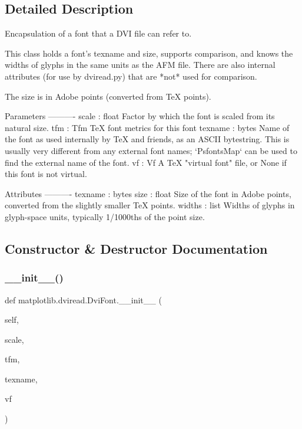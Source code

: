 \subsection{Detailed Description}
\begin{DoxyVerb}Encapsulation of a font that a DVI file can refer to.

This class holds a font's texname and size, supports comparison,
and knows the widths of glyphs in the same units as the AFM file.
There are also internal attributes (for use by dviread.py) that
are *not* used for comparison.

The size is in Adobe points (converted from TeX points).

Parameters
----------
scale : float
    Factor by which the font is scaled from its natural size.
tfm : Tfm
    TeX font metrics for this font
texname : bytes
   Name of the font as used internally by TeX and friends, as an ASCII
   bytestring.  This is usually very different from any external font
   names; `PsfontsMap` can be used to find the external name of the font.
vf : Vf
   A TeX "virtual font" file, or None if this font is not virtual.

Attributes
----------
texname : bytes
size : float
   Size of the font in Adobe points, converted from the slightly
   smaller TeX points.
widths : list
   Widths of glyphs in glyph-space units, typically 1/1000ths of
   the point size.\end{DoxyVerb}
 

\subsection{Constructor \& Destructor Documentation}
\mbox{\label{classmatplotlib_1_1dviread_1_1DviFont_a37c86c55aae04802fc5467b7e49d14a7}} 
\subsubsection{\texorpdfstring{\+\_\+\+\_\+init\+\_\+\+\_\+()}{\_\_init\_\_()}}
{\footnotesize\ttfamily def matplotlib.\+dviread.\+Dvi\+Font.\+\_\+\+\_\+init\+\_\+\+\_\+ (\begin{DoxyParamCaption}\item[{}]{self,  }\item[{}]{scale,  }\item[{}]{tfm,  }\item[{}]{texname,  }\item[{}]{vf }\end{DoxyParamCaption})}




